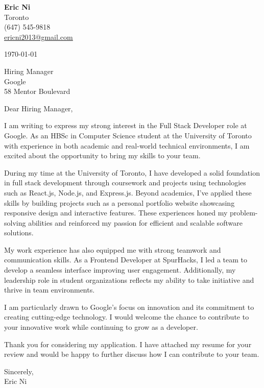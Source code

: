 \documentclass[10pt]{article}
\begin{document}
\noindent
\textbf{Eric Ni} \\
Toronto \\
(647) 545-9818 \\
\href{mailto:ericni2013@gmail.com}{\underline{ericni2013@gmail.com}}

\vspace{1em}

\today

\vspace{1em}

Hiring Manager \\
Google \\
58 Mentor Boulevard

\vspace{1em}

Dear Hiring Manager,

I am writing to express my strong interest in the Full Stack Developer role at Google. As an HBSc in Computer Science student at the University of Toronto with experience in both academic and real-world technical environments, I am excited about the opportunity to bring my skills to your team.

During my time at the University of Toronto, I have developed a solid foundation in full stack development through coursework and projects using technologies such as React.js, Node.js, and Express.js. Beyond academics, I've applied these skills by building projects such as a personal portfolio website showcasing responsive design and interactive features. These experiences honed my problem-solving abilities and reinforced my passion for efficient and scalable software solutions.

My work experience has also equipped me with strong teamwork and communication skills. As a Frontend Developer at SpurHacks, I led a team to develop a seamless interface improving user engagement. Additionally, my leadership role in student organizations reflects my ability to take initiative and thrive in team environments.

I am particularly drawn to Google’s focus on innovation and its commitment to creating cutting-edge technology. I would welcome the chance to contribute to your innovative work while continuing to grow as a developer.

Thank you for considering my application. I have attached my resume for your review and would be happy to further discuss how I can contribute to your team.

\vspace{1em}

Sincerely, \\
Eric Ni
\end{document}
